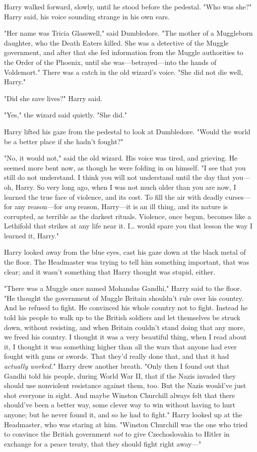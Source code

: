 Harry walked forward, slowly, until he stood before the pedestal. "Who was 
she?" Harry said, his voice sounding strange in his own ears.

"Her name was Tricia Glasswell," said Dumbledore. "The mother of a Muggleborn 
daughter, who the Death Eaters killed. She was a detective of the Muggle 
government, and after that she fed information from the Muggle authorities to 
the Order of the Phoenix, until she was---betrayed---into the hands of 
Voldemort." There was a catch in the old wizard's voice. "She did not die well, 
Harry."

"Did she save lives?" Harry said.

"Yes," the wizard said quietly. "She did."

Harry lifted his gaze from the pedestal to look at Dumbledore. "Would the world 
be a better place if she hadn't fought?"

"No, it would not," said the old wizard. His voice was tired, and grieving. He 
seemed more bent now, as though he were folding in on himself. "I see that you 
still do not understand. I think you will not understand until the day that 
you---oh, Harry. So very long ago, when I was not much older than you are now, 
I learned the true face of violence, and its cost. To fill the air with deadly 
curses---for any reason---for \emph{any} reason, Harry---it is an ill thing, 
and its nature is corrupted, as terrible as the darkest rituals. Violence, once 
begun, becomes like a Lethifold that strikes at any life near it. I{\ldots} 
would spare you that lesson the way I learned it, Harry."

Harry looked away from the blue eyes, cast his gaze down at the black metal of 
the floor. The Headmaster was trying to tell him something important, that was 
clear; and it wasn't something that Harry thought was stupid, either.

"There was a Muggle once named Mohandas Gandhi," Harry said to the floor. "He 
thought the government of Muggle Britain shouldn't rule over his country. And 
he refused to fight. He convinced his whole country not to fight. Instead he 
told his people to walk up to the British soldiers and let themselves be struck 
down, without resisting, and when Britain couldn't stand doing that any more, 
we freed his country. I thought it was a very beautiful thing, when I read 
about it, I thought it was something higher than all the wars that anyone had 
ever fought with guns or swords. That they'd really done that, and that it had 
\emph{actually worked.}" Harry drew another breath. "Only then I found out that 
Gandhi told his people, during World War II, that if the Nazis invaded they 
should use nonviolent resistance against them, too. But the Nazis would've just 
shot everyone in sight. And maybe Winston Churchill always felt that there 
should've been a better way, some clever way to win without having to hurt 
anyone; but he never found it, and so he had to fight." Harry looked up at the 
Headmaster, who was staring at him. "Winston Churchill was the one who tried to 
convince the British government \emph{not} to give Czechoslovakia to Hitler in 
exchange for a peace treaty, that they should fight right away---"


